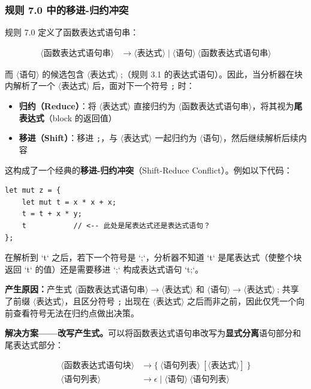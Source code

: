 \documentclass[12pt,a4paper]{ctexart}
\begin{document}
\subsubsection{规则 7.0 中的移进-归约冲突}

规则 7.0 定义了函数表达式语句串：

\begin{align}
\langle\text{函数表达式语句串}\rangle &\rightarrow \langle\text{表达式}\rangle \mid \langle\text{语句}\rangle \ \langle\text{函数表达式语句串}\rangle
\end{align}

而 $\langle\text{语句}\rangle$ 的候选包含 $\langle\text{表达式}\rangle \ \texttt{;}$（规则 3.1 的表达式语句）。因此，当分析器在块内解析了一个 $\langle\text{表达式}\rangle$ 后，面对下一个符号 \texttt{;} 时：

\begin{itemize}
    \item \textbf{归约（Reduce）}：将 $\langle\text{表达式}\rangle$ 直接归约为 $\langle\text{函数表达式语句串}\rangle$，将其视为\textbf{尾表达式}（block 的返回值）
    \item \textbf{移进（Shift）}：移进 \texttt{;}，与 $\langle\text{表达式}\rangle$ 一起归约为 $\langle\text{语句}\rangle$，然后继续解析后续内容
\end{itemize}

这构成了一个经典的\textbf{移进-归约冲突}（Shift-Reduce Conflict）。例如以下代码：

\begin{lstlisting}[language=RustLike]
let mut z = {
    let mut t = x * x + x;
    t = t + x * y;
    t           // <-- 此处是尾表达式还是表达式语句？
};
\end{lstlisting}

在解析到 `t` 之后，若下一个符号是 `;`，分析器不知道 `t` 是尾表达式（使整个块返回 `t` 的值）还是需要移进 `;` 构成表达式语句 `t;`。

\textbf{产生原因：}产生式 $\langle\text{函数表达式语句串}\rangle \rightarrow \langle\text{表达式}\rangle$ 和 $\langle\text{语句}\rangle \rightarrow \langle\text{表达式}\rangle \ \texttt{;}$ 共享了前缀 $\langle\text{表达式}\rangle$，且区分符号 \texttt{;} 出现在 $\langle\text{表达式}\rangle$ 之后而非之前，因此仅凭一个向前查看符号无法在归约点做出决策。

\textbf{解决方案——改写产生式。}可以将函数表达式语句串改写为\textbf{显式分离}语句部分和尾表达式部分：

\begin{align}
\langle\text{函数表达式语句块}\rangle &\rightarrow \texttt{\{} \ \langle\text{语句列表}\rangle \ [\langle\text{表达式}\rangle] \ \texttt{\}} \\
\langle\text{语句列表}\rangle &\rightarrow \epsilon \mid \langle\text{语句}\rangle \ \langle\text{语句列表}\rangle
\end{align}
\end{document}
